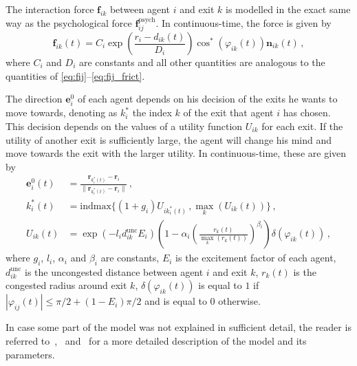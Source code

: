 The interaction force $\bm{f}_{ik}$ between agent $i$ and exit $k$ is modelled in the exact same way as the psychological force $\bm{f}_{ij}^{\mathrm{psych}}$. In continuous-time, the force is given by
\begin{equation} \label{eq:fik}
	\bm{f}_{ik}(t) = C_i \exp\left(\frac{r_{i}-d_{ik}(t)}{D_i}\right) \cos^*(\varphi_{ik}(t)) \bm{n}_{ik}(t) \,,
\end{equation}
where $C_i$ and $D_i$ are constants and all other quantities are analogous to the quantities of \eqref{eq:fij}--\eqref{eq:fij_frict}.

The direction $\bm{e}_i^0$ of each agent depends on his decision of the exits he wants to move towards, denoting as $k_i^*$ the index $k$ of the exit that agent $i$ has chosen. This decision depends on the values of a utility function $U_{ik}$ for each exit. If the utility of another exit is sufficiently large, the agent will change his mind and move towards the exit with the larger utility. In continuous-time, these are given by
\begin{subequations}
\begin{align}
	\bm{e}_i^0(t) & = \frac{\bm{r}_{k_i^*(t)} - \bm{r}_i}{\lVert \bm{r}_{k_i^*(t)} - \bm{r}_i \rVert}  \,, \label{eq:ei} \\
	k_i^*(t) & = \mathrm{indmax}\{ (1+g_i) U_{ik_i^*(t)} \,, \max_k\left(U_{ik}(t)\right) \} \,, \label{eq:ki} \\
	U_{ik}(t) & = \exp\left( -l_i d_{ik}^{\mathrm{unc}} E_i \right) \left(1-\alpha_i\left(\frac{r_k(t)}{\max_k\left(r_k(t)\right)}\right)^{\beta_i}\right) \delta(\varphi_{ik}(t)) \,, \label{eq:Uik}
\end{align}
\end{subequations}
where $g_i$, $l_i$, $\alpha_i$ and $\beta_i$ are constants, $E_i$ is the excitement factor of each agent, $d_{ik}^{\mathrm{unc}}$ is the uncongested distance between agent $i$ and exit $k$, $r_k(t)$ is the congested radius around exit $k$, $\delta(\varphi_{ik}(t))$ is equal to $1$ if $|\varphi_{ij}(t)| \leq \pi/2 + (1-E_i)\pi/2$ and is equal to $0$ otherwise.

In case some part of the model was not explained in sufficient detail, the reader is referred to~\citet{Helbing2000},~\citet{Zainuddin2010} and~\citet{Wang2016} for a more detailed description of the model and its parameters.
